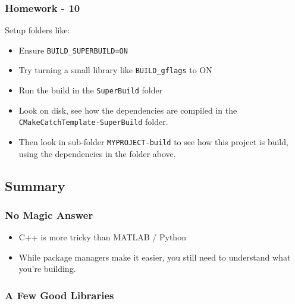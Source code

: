 \subsubsection{Homework - 10}\label{homework---10}

Setup folders like:

\begin{Shaded}
\begin{Highlighting}[]

\end{Highlighting}
\end{Shaded}

\begin{itemize}
\itemsep1pt\parskip0pt
\item
  Ensure \texttt{BUILD\_SUPERBUILD=ON}
\item
  Try turning a small library like \texttt{BUILD\_gflags} to ON
\item
  Run the build in the \texttt{SuperBuild} folder
\item
  Look on disk, see how the dependencies are compiled in the
  \texttt{CMakeCatchTemplate-SuperBuild} folder.
\item
  Then look in sub-folder \texttt{MYPROJECT-build} to see how this
  project is build, using the dependencies in the folder above.
\end{itemize}

\subsection{Summary}\label{summary-2}

\subsubsection{No Magic Answer}\label{no-magic-answer}

\begin{itemize}
\itemsep1pt\parskip0pt
\item
  C++ is more tricky than MATLAB / Python
\item
  While package managers make it easier, you still need to understand
  what you're building.
\end{itemize}

\subsubsection{A Few Good Libraries}\label{a-few-good-libraries-1}


